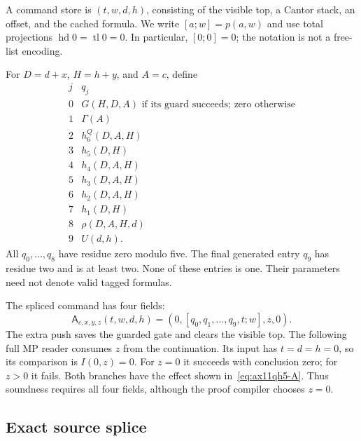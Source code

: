 A command store is $(t,w,d,h)$, consisting of the visible top, a Cantor
stack, an offset, and the cached formula. We write $[a;w]=p(a,w)$ and
use total projections $\operatorname{hd}0=\operatorname{tl}0=0$.
In particular, $[0;0]=0$; the notation is not a free-list encoding.

For $D=d+x$, $H=h+y$, and $A=c$, define
\[
\begin{array}{c|l}
 j&q_j\\\hline
 0&G(H,D,A)\text{ if its guard succeeds; zero otherwise}\\
 1&\Gamma(A)\\
 2&h_6^Q(D,A,H)\\
 3&h_5(D,H)\\
 4&h_4(D,A,H)\\
 5&h_3(D,A,H)\\
 6&h_2(D,A,H)\\
 7&h_1(D,H)\\
 8&\rho(D,A,H,d)\\
 9&U(d,h).
\end{array}
\]
All $q_0,\ldots,q_8$ have residue zero modulo five. The final generated
entry $q_9$ has residue two and is at least two. None of these entries is
one. Their parameters need not denote valid tagged formulas.

The spliced command has four fields:
\begin{equation}
 \mathsf A_{c,x,y,z}(t,w,d,h)
       =(0,[q_0,q_1,\ldots,q_9,t;w],z,0).
 \label{eq:ax11qh5-A}
\end{equation}
The extra push saves the guarded gate and clears the visible top. The
following full MP reader consumes $z$ from the continuation. Its input has
$t=d=h=0$, so its comparison is $I(0,z)=0$. For $z=0$ it succeeds with
conclusion zero; for $z>0$ it fails. Both branches have the effect shown
in~\eqref{eq:ax11qh5-A}. Thus soundness requires all four fields, although
the proof compiler chooses $z=0$.

\subsection{Exact source splice}

